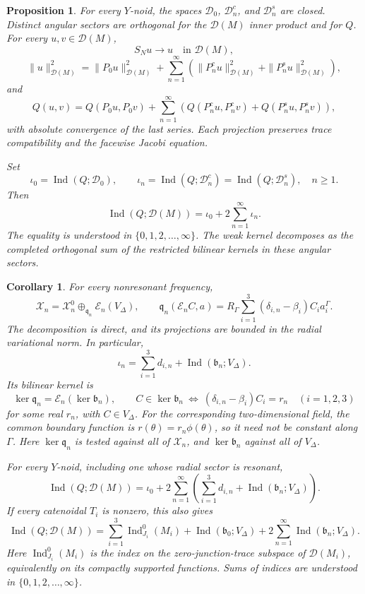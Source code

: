 \documentclass[10pt,a4paper]{amsart}
\newtheorem{cor}[thm]{Corollary}
\newtheorem{prop}[thm]{Proposition}
\begin{document}
\begin{prop}\label{prop: second assumption steklov}
For every $Y$-noid, the spaces $\mathcal D_0$, $\mathcal D_n^c$, and $\mathcal D_n^s$ are closed. Distinct angular sectors are orthogonal for the $\mathcal D(M)$ inner product and for $Q$. For every $u,v\in\mathcal D(M)$,
\[
S_Nu\longrightarrow u\quad\text{in }\mathcal D(M),
\]
\[
\|u\|_{\mathcal D(M)}^2
=\|P_0u\|_{\mathcal D(M)}^2
+\sum_{n=1}^\infty\left(\|P_n^cu\|_{\mathcal D(M)}^2+\|P_n^su\|_{\mathcal D(M)}^2\right),
\]
and
\[
Q(u,v)=Q(P_0u,P_0v)
+\sum_{n=1}^\infty\left(Q(P_n^cu,P_n^cv)+Q(P_n^su,P_n^sv)\right),
\]
with absolute convergence of the last series. Each projection preserves trace compatibility and the facewise Jacobi equation.

Set
\[
\iota_0=\operatorname{Ind}(Q;\mathcal D_0),
\qquad
\iota_n=\operatorname{Ind}(Q;\mathcal D_n^c)=\operatorname{Ind}(Q;\mathcal D_n^s),\quad n\ge1.
\]
Then
\[
\operatorname{Ind}(Q;\mathcal D(M))
=\iota_0+2\sum_{n=1}^\infty\iota_n.
\]
The equality is understood in $\{0,1,2,\ldots,\infty\}$. The weak kernel decomposes as the completed orthogonal sum of the restricted bilinear kernels in these angular sectors.
\end{prop}

\begin{cor}\label{coro: general index decom}
For every nonresonant frequency,
\[
\mathcal X_n=\mathcal X_n^0\oplus_{\mathfrak q_n}\mathscr E_n(V_\Delta),
\qquad
\mathfrak q_n(\mathscr E_n C,a)
=R_\Gamma\sum_{i=1}^3(\delta_{i,n}-\beta_i)C_i a_i^\Gamma.
\]
The decomposition is direct, and its projections are bounded in the radial variational norm. In particular,
\[
\iota_n=\sum_{i=1}^3d_{i,n}
+\operatorname{Ind}(\mathfrak b_n;V_\Delta).
\]
Its bilinear kernel is
\[
\ker\mathfrak q_n
=\mathscr E_n(\ker\mathfrak b_n),
\qquad
C\in\ker\mathfrak b_n
\ \Longleftrightarrow\
(\delta_{i,n}-\beta_i)C_i=r_n\quad(i=1,2,3)
\]
for some real $r_n$, with $C\in V_\Delta$. For the corresponding two-dimensional field, the common boundary function is $r(\theta)=r_n\phi(\theta)$, so it need not be constant along $\Gamma$. Here $\ker\mathfrak q_n$ is tested against all of $\mathcal X_n$, and $\ker\mathfrak b_n$ against all of $V_\Delta$.

For every $Y$-noid, including one whose radial sector is resonant,
\[
\operatorname{Ind}(Q;\mathcal D(M))
=\iota_0+2\sum_{n=1}^{\infty}
\left(\sum_{i=1}^3d_{i,n}+\operatorname{Ind}(\mathfrak b_n;V_\Delta)\right).
\]
If every catenoidal $T_i$ is nonzero, this also gives
\[
\operatorname{Ind}(Q;\mathcal D(M))
=\sum_{i=1}^3 \operatorname{Ind}_{J_i}^0(M_i)
+\operatorname{Ind}(\mathfrak b_0;V_\Delta)
+2\sum_{n=1}^{\infty}\operatorname{Ind}(\mathfrak b_n;V_\Delta).
\]
Here $\operatorname{Ind}_{J_i}^0(M_i)$ is the index on the zero-junction-trace subspace of $\mathcal D(M_i)$, equivalently on its compactly supported functions. Sums of indices are understood in $\{0,1,2,\ldots,\infty\}$.
\end{cor}
\end{document}
